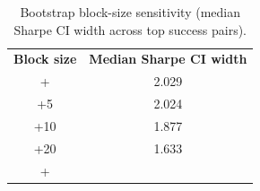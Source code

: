 \begin{table}[t]
\centering
\caption{Bootstrap block-size sensitivity (median Sharpe CI width across top success pairs).}
\label{tab:bootstrap_block_sensitivity}
\small
\begin{tabular}{cc}
\hline
\textbf{Block size} & \textbf{Median Sharpe CI width} \\
+\hline
3 & 2.029 \\
+5 & 2.024 \\
+10 & 1.877 \\
+20 & 1.633 \\
+\hline
\end{tabular}
\end{table}
